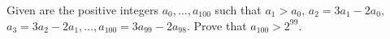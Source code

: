 Given are the positive integers $a_0, \ldots, a_{100}$ such that $a_1 > a_0$, $a_2 = 3a_1 - 2a_0$, $a_3 = 3a_2 - 2a_1, \ldots, a_{100} = 3a_{99} - 2a_{98}$. Prove that $a_{100} > 2^{99}$.
